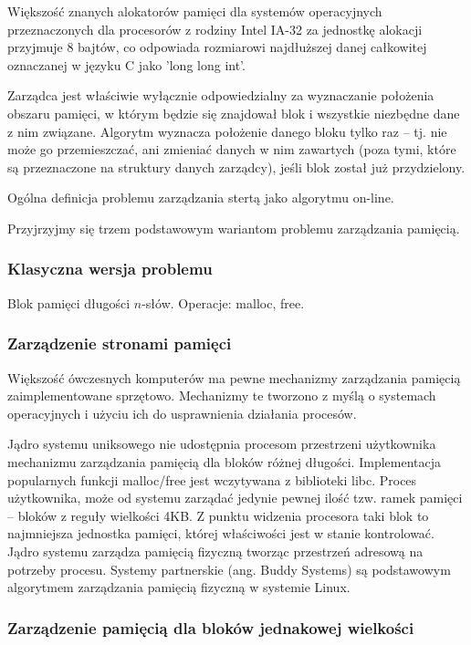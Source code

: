 \documentclass[12pt,a4paper,titlepage,twoside]{mwart}
\begin{document}
Większość znanych alokatorów pamięci dla systemów operacyjnych przeznaczonych
dla procesorów z rodziny Intel IA-32 za jednostkę alokacji przyjmuje 8 bajtów,
co odpowiada rozmiarowi najdłuższej danej całkowitej oznaczanej w języku C jako
'long long int'.

Zarządca jest właściwie wyłącznie odpowiedzialny za wyznaczanie położenia
obszaru pamięci, w którym będzie się znajdował blok i wszystkie niezbędne dane
z nim związane. Algorytm wyznacza położenie danego bloku tylko raz -- tj. nie
może go przemieszczać, ani zmieniać danych w nim zawartych (poza tymi, które są
przeznaczone na struktury danych zarządcy), jeśli blok został już przydzielony.



Ogólna definicja problemu zarządzania stertą jako algorytmu on-line.

Przyjrzyjmy się trzem podstawowym wariantom problemu zarządzania pamięcią.

\subsubsection{Klasyczna wersja problemu}

Blok pamięci długości $n$-słów. Operacje: malloc, free.

\subsubsection{Zarządzenie stronami pamięci}

Większość ówczesnych komputerów ma pewne mechanizmy zarządzania pamięcią
zaimplementowane sprzętowo. Mechanizmy te tworzono z myślą o systemach
operacyjnych i użyciu ich do usprawnienia działania procesów.

Jądro systemu uniksowego nie udostępnia procesom przestrzeni użytkownika
mechanizmu zarządzania pamięcią dla bloków różnej długości. Implementacja
popularnych funkcji malloc/free jest wczytywana z biblioteki libc. Proces
użytkownika, może od systemu zarządać jedynie pewnej ilość tzw. ramek pamięci
-- bloków z reguły wielkości 4KB. Z punktu widzenia procesora taki blok to
najmniejsza jednostka pamięci, której właściwości jest w stanie kontrolować.
Jądro systemu zarządza pamięcią fizyczną tworząc przestrzeń adresową na
potrzeby procesu. Systemy partnerskie (ang. Buddy Systems) są podstawowym
algorytmem zarządzania pamięcią fizyczną w systemie Linux.

\subsubsection{Zarządzenie pamięcią dla bloków jednakowej wielkości}
\end{document}
